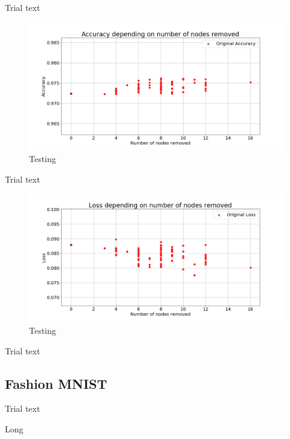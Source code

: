 \documentclass[UKenglish]{ifimaster}
\begin{document}
            Trial text

            \begin{figure}[h!]\centering
                \includegraphics[width=\textwidth]{Accuracy_vs_nodes_removed_mnist.png}
                \caption[Short title]{Testing}
                \label{fig:acc_rn_imp_mnist}
            \end{figure}

            Trial text

            \begin{figure}[h!]\centering
                \includegraphics[width=\textwidth]{Loss_vs_nodes_removed_mnist.png}
                \caption[Short title]{Testing}
                \label{fig:loss_rn_imp_mnist}
            \end{figure}

            Trial text

        \subsection{Fashion MNIST}

            Trial text

            \begin{table}[h!]
                \centering
                \resizebox{\textwidth}{!}{}
                \caption[Short]{Long}
                \label{tab:ac_rnd_rem_fmnist}
            \end{table}
\end{document}
